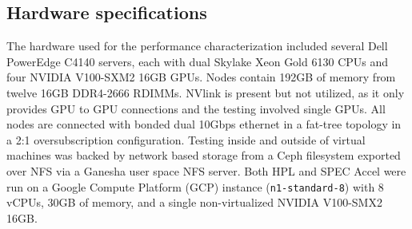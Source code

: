\documentclass[acmtog, authorversion]{acmart}
\begin{document}
\subsection{Hardware specifications}\label{sec:hardspec}
The hardware used for the performance characterization included several Dell PowerEdge C4140 servers, each with dual Skylake Xeon Gold 6130 \cite{skylake} CPUs and four NVIDIA V100-SXM2 16GB \cite{v100-specs} GPUs. Nodes contain 192GB of memory from twelve 16GB DDR4-2666 RDIMMs. NVlink is present but not utilized, as it only provides GPU to GPU connections and the testing involved single GPUs. All nodes are connected with bonded dual 10Gbps ethernet in a fat-tree topology in a 2:1 oversubscription configuration. Testing inside and outside of virtual machines was backed by network based storage from a Ceph filesystem exported over NFS via a Ganesha user space NFS server. Both HPL and SPEC Accel were run on a Google Compute Platform (GCP) instance ({\tt n1-standard-8}) with 8 vCPUs, 30GB of memory, and a single non-virtualized NVIDIA V100-SMX2 16GB.
\end{document}
